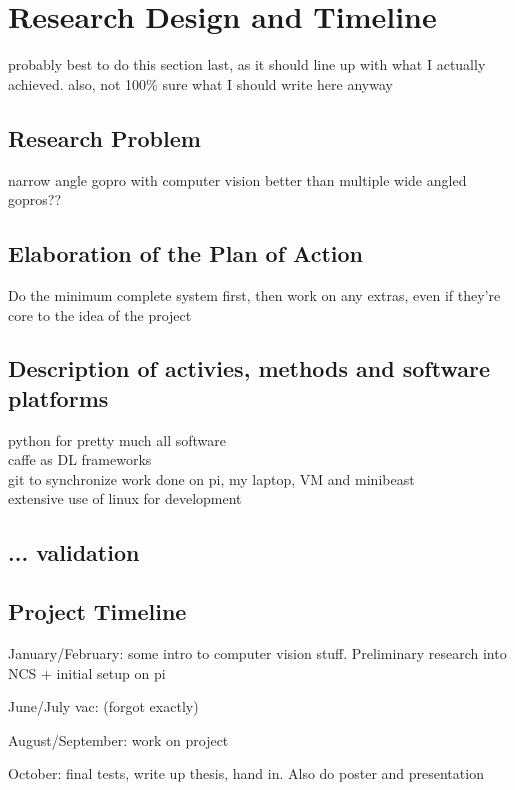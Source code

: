 \chapter{Research Design and Timeline}

{\Large \color{red} probably best to do this section last, as it should line up with what I actually achieved. also, not 100\% sure what I should write here anyway}

\section{Research Problem}
narrow angle gopro with computer vision better than multiple wide angled gopros??

\section{Elaboration of the Plan of Action}
Do the minimum complete system first, then work on any extras, even if they're core to the idea of the project


\section{Description of activies, methods and software platforms}
python for pretty much all software \\
caffe as DL frameworks \\
git to synchronize work done on pi, my laptop, VM and minibeast \\
extensive use of linux for development



\section{... validation}



\section{Project Timeline}
January/February: some intro to computer vision stuff. Preliminary research into NCS + initial setup on pi

June/July vac: (forgot exactly)

August/September: work on project

October: final tests, write up thesis, hand in. Also do poster and presentation

